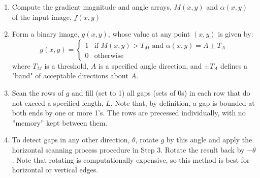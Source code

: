 \begin{enumerate}
	\item Compute the gradient magnitude and angle arrays, $M(x,y)$ and $\alpha(x,y)$ of the input image, $f(x,y)$
	\item Form a binary image, $g(x,y)$, whose value at any point $(x,y)$ is given by:
		\[
			g(x,y) =
				\begin{cases}
					1 & \text{if } M(x,y) > T_M \text{ and } \alpha(x,y) = A \pm T_A\\
					0 & \text{otherwise}
				\end{cases}
		\]
		where $T_M$ is a threshold, $A$ is a specified angle direction, and $\pm T_A$ defines a "band" of acceptable directions about $A$.
	\item Scan the rows of $g$ and fill (set to 1) all gaps (sets of 0s) in each row that do not exceed a specified length, $L$.
		Note that, by definition, a gap is bounded at both ends by one or more 1's.
		The rows are precessed individually, with no ''memory'' kept between them.
	\item To detect gaps in any other direction, $\theta$, rotate $g$ by this angle and apply the horizontal scanning process procedure in Step 3.
		Rotate the result back by $-\theta$. Note that rotating is computationally expensive, so this method is best for horizontal or vertical edges.
\end{enumerate}


